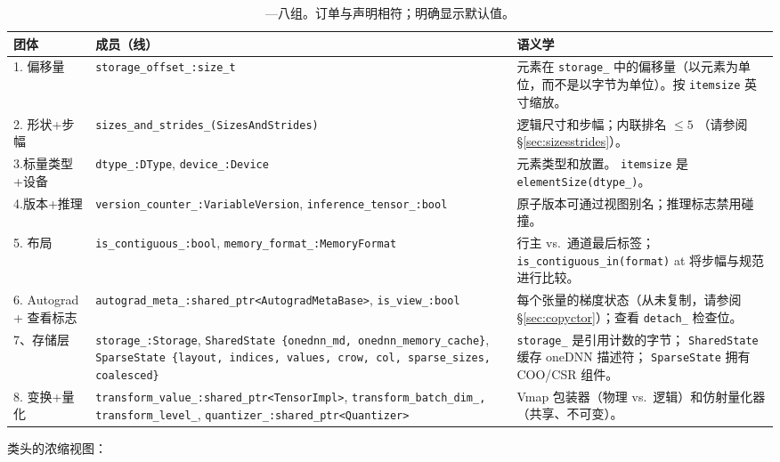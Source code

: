\begin{table}[H]
\centering
\caption{---八组。订单与声明相符；明确显示默认值。}
\label{tab:tensorimplfields}
\small
\begin{tabular}{p{2.6cm}p{4.7cm}p{6.2cm}}
\toprule
团体 & 成员（线） & 语义学 \\
\midrule
1. 偏移量 & \texttt{storage\_offset\_:size\_t} & 元素在 \texttt{storage\_} 中的偏移量（以元素为单位，而不是以字节为单位）。按 \texttt{itemsize} 英寸缩放。 \\
2. 形状+步幅 & \texttt{sizes\_and\_strides\_(SizesAndStrides)} & 逻辑尺寸和步幅；内联排名 $\le 5$ （请参阅 \S\ref{sec:sizesstrides}）。 \\
3.标量类型+设备 & \texttt{dtype\_:DType}, \texttt{device\_:Device} & 元素类型和放置。 \texttt{itemsize} 是 \texttt{elementSize(dtype\_)}。 \\
4.版本+推理 & \texttt{version\_counter\_:VariableVersion}, \texttt{inference\_tensor\_:bool} & 原子版本可通过视图别名；推理标志禁用碰撞。 \\
5. 布局 & \texttt{is\_contiguous\_:bool}, \texttt{memory\_format\_:MemoryFormat} & 行主 vs.\ 通道最后标签； \texttt{is\_contiguous\_in(format)} at 将步幅与规范进行比较。 \\
6. Autograd + 查看标志 & \texttt{autograd\_meta\_:shared\_ptr<AutogradMetaBase>}, \texttt{is\_view\_:bool} & 每个张量的梯度状态（从未复制，请参阅 \S\ref{sec:copyctor}）；查看 \texttt{detach\_} 检查位。 \\
7、存储层 & \texttt{storage\_:Storage}, \texttt{SharedState \{onednn\_md, onednn\_memory\_cache\}}, \texttt{SparseState \{layout, indices, values, crow, col, sparse\_sizes, coalesced\}} & \texttt{storage\_} 是引用计数的字节； \texttt{SharedState} 缓存 oneDNN 描述符； \texttt{SparseState} 拥有 COO/CSR 组件。 \\
8. 变换+量化 & \texttt{transform\_value\_:shared\_ptr<TensorImpl>}, \texttt{transform\_batch\_dim\_, transform\_level\_}, \texttt{quantizer\_:shared\_ptr<Quantizer>} & Vmap 包装器（物理 vs.\ 逻辑）和仿射量化器（共享、不可变）。 \\
\bottomrule
\end{tabular}
\end{table}

类头的浓缩视图：

